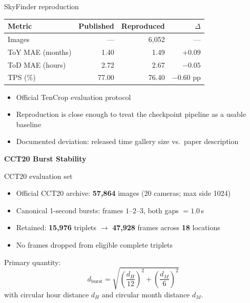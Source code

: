 \documentclass[aspectratio=169,11pt]{beamer}
\begin{document}
\begin{frame}{SkyFinder reproduction}
\begin{center}
\renewcommand{\arraystretch}{1.35}
\begin{tabular}{lrrr}
\toprule
\textbf{Metric} & \textbf{Published} & \textbf{Reproduced} & \textbf{$\Delta$} \\
\midrule
Images & --- & 6{,}052 & --- \\
ToY MAE (months) & 1.40 & 1.49 & $+0.09$ \\
ToD MAE (hours) & 2.72 & 2.67 & $-0.05$ \\
TPS (\%) & 77.00 & 76.40 & $-0.60$ pp \\
\bottomrule
\end{tabular}
\end{center}
\vspace{0.8em}
\begin{itemize}
  \item Official TenCrop evaluation protocol
  \item Reproduction is close enough to treat the checkpoint pipeline as a usable baseline
  \item Documented deviation: released time gallery size vs.\ paper description
\end{itemize}
\end{frame}

\begin{frame}[plain]
\begin{center}
\vspace{2.4cm}
{\color{aiia}\Huge\bfseries CCT20 Burst Stability}
\end{center}
\end{frame}

\begin{frame}{CCT20 evaluation set}
\begin{itemize}
  \item Official CCT20 archive: \textbf{57{,}864} images (20 cameras; max side 1024)
  \item Canonical 1-second bursts: frames $1$--$2$--$3$, both gaps $=1.0$\,s
  \item Retained: \textbf{15{,}976} triplets $\rightarrow$ \textbf{47{,}928} frames across \textbf{18} locations
  \item No frames dropped from eligible complete triplets
\end{itemize}
\vspace{0.6em}
Primary quantity:
\[
d_{\mathrm{burst}}
=
\sqrt{
\left(\frac{d_H}{12}\right)^2
+
\left(\frac{d_M}{6}\right)^2
}
\]
with circular hour distance $d_H$ and circular month distance $d_M$.
\end{frame}
\end{document}
